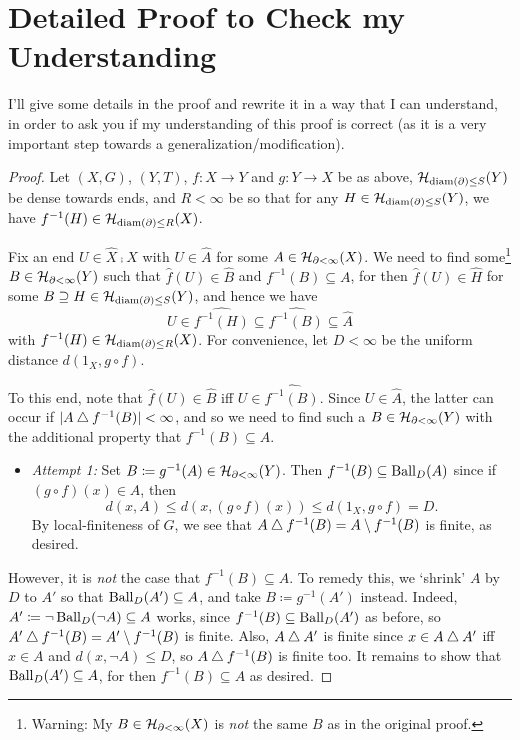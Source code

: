 \documentclass{amsart}
\begin{document}
    \setcounter{section}{1}
    \section{Detailed Proof to Check my Understanding}

    I'll give some details in the proof and rewrite it in a way that I can understand, in order to ask you if my understanding of this proof is correct (as it is a very important step towards a generalization/modification).

    \begin{proof}
        Let $(X,G)$, $(Y,T)$, $f:X\to Y$ and $g:Y\to X$ be as above, $\mathcal{H}_{\operatorname{diam}(\partial)\leq S}(Y)$ be dense towards ends, and $R<\infty$ be so that for any $H\in\mathcal{H}_{\operatorname{diam}(\partial)\leq S}(Y)$, we have $f^{-1}(H)\in\mathcal{H}_{\operatorname{diam}(\partial)\leq R}(X)$.

        Fix an end $U\in\widehat{X}\comp X$ with $U\in\widehat{A}$ for some $A\in\mathcal{H}_{\partial<\infty}(X)$. We need to find some\footnote{Warning: My $B\in\mathcal{H}_{\partial<\infty}(X)$ is \textit{not} the same $B$ as in the original proof.} $B\in\mathcal{H}_{\partial<\infty}(Y)$ such that $\widehat{f}(U)\in\widehat{B}$ and $f^{-1}(B)\subseteq A$, for then $\widehat{f}(U)\in\widehat{H}$ for some $B\supseteq H\in\mathcal{H}_{\operatorname{diam}(\partial)\leq S}(Y)$, and hence we have
        \begin{equation*}
            U\in\widehat{f^{-1}(H)}\subseteq\widehat{f^{-1}(B)}\subseteq\widehat{A}
        \end{equation*}
        with $f^{-1}(H)\in\mathcal{H}_{\operatorname{diam}(\partial)\leq R}(X)$. For convenience, let $D<\infty$ be the uniform distance $d(1_X,g\circ f)$.

        To this end, note that $\widehat{f}(U)\in\widehat{B}$ iff $U\in\widehat{f^{-1}(B)}$. Since $U\in\widehat{A}$, the latter can occur if $|A\bigtriangleup f^{-1}(B)|<\infty$, and so we need to find such a $B\in\mathcal{H}_{\partial<\infty}(Y)$ with the additional property that $f^{-1}(B)\subseteq A$.
        \begin{itemize}
            \item \textit{Attempt 1:} Set $B\coloneqq g^{-1}(A)\in\mathcal{H}_{\partial<\infty}(Y)$. Then $f^{-1}(B)\subseteq\operatorname{Ball}_D(A)$ since if $(g\circ f)(x)\in A$, then
                \begin{equation*}
                    d(x,A)\leq d(x,(g\circ f)(x))\leq d(1_X,g\circ f)=D.
                \end{equation*}
            By local-finiteness of $G$, we see that $A\bigtriangleup f^{-1}(B)=A\setminus f^{-1}(B)$ is finite, as desired.
        \end{itemize}
        However, it is \textit{not} the case that $f^{-1}(B)\subseteq A$. To remedy this, we `shrink' $A$ by $D$ to $A'$ so that $\operatorname{Ball}_D(A')\subseteq A$, and take $B\coloneqq g^{-1}(A')$ instead. Indeed, $A'\coloneqq\lnot\operatorname{Ball}_D(\lnot A)\subseteq A$ works, since $f^{-1}(B)\subseteq\operatorname{Ball}_D(A')$ as before, so $A'\bigtriangleup f^{-1}(B)=A'\setminus f^{-1}(B)$ is finite. Also, $A\bigtriangleup A'$ is finite since $x\in A\bigtriangleup A'$ iff $x\in A$ and $d(x,\lnot A)\leq D$, so $A\bigtriangleup f^{-1}(B)$ is finite too. It remains to show that $\operatorname{Ball}_D(A')\subseteq A$, for then $f^{-1}(B)\subseteq A$ as desired.


\end{proof}
\end{document}

